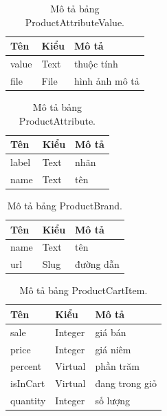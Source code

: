 \documentclass[11pt]{report}
\begin{document}
	
	\begin{table}[h!]
		\begin{center}
			\caption{Mô tả bảng ProductAttributeValue.}
			\begin{tabularx}{0.6\textwidth}{ |l|l|X| } 
				\hline
				Tên & Kiểu & Mô tả \\
				\hline
				value & Text & thuộc tính \\
				file & File & hình ảnh mô tả \\ 
				\hline
			\end{tabularx}
			\label{table:ProductAttributeValue}
		\end{center}
	\end{table}
	
	
	\begin{table}[h!]
		\begin{center}
			\caption{Mô tả bảng ProductAttribute.}
			\begin{tabularx}{0.6\textwidth}{ |l|l|X| } 
				\hline
				Tên & Kiểu & Mô tả \\
				\hline
				label & Text & nhãn \\
				name & Text & tên \\
				\hline
			\end{tabularx}
			\label{table:ProductAttribute}
		\end{center}
	\end{table}
	
	
	\begin{table}[h!]
		\begin{center}
			\caption{Mô tả bảng ProductBrand.}
			\begin{tabularx}{0.6\textwidth}{ |l|l|X| } 
				\hline
				Tên & Kiểu & Mô tả \\
				\hline
				name & Text & tên \\
				url & Slug & đường dẫn \\
				\hline
			\end{tabularx}
			\label{table:ProductBrand}
		\end{center}
	\end{table}
	
	
	\begin{table}[h!]
		\begin{center}
			\caption{Mô tả bảng ProductCartItem.}
			\begin{tabularx}{0.6\textwidth}{ |l|l|X| } 
				\hline
				Tên & Kiểu & Mô tả \\
				\hline
				sale & Integer & giá bán \\
				price & Integer & giá niêm \\
				percent & Virtual & phần trăm \\
				isInCart & Virtual & đang trong giỏ \\
				quantity & Integer & số lượng \\ 
				\hline
			\end{tabularx}
			\label{table:ProductCartItem}
		\end{center}
	\end{table}
	
\end{document}
